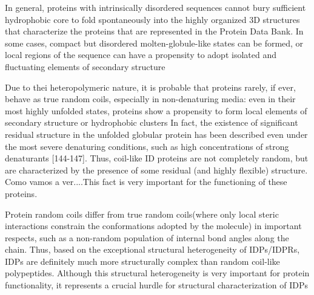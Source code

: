 In general, proteins with intrinsically disordered sequences cannot bury sufficient hydrophobic core to fold spontaneously into the highly organized 3D structures that characterize the proteins that are represented in the Protein Data Bank.
In some cases, compact but disordered molten-globule-like states can be formed, or local regions of the sequence can have a propensity to adopt isolated and fluctuating elements of secondary structure 

Due to thei heteropolymeric nature, it is probable that proteins rarely, if ever, behave as true random coils, especially in non-denaturing media: 
even in their most highly unfolded states, proteins show a propensity to form local elements of secondary structure or hydrophobic clusters
In fact, the existence of significant residual structure in the unfolded globular protein has been described even under the most severe denaturing conditions, such as high concentrations of strong denaturants [144-147]. 
Thus, coil-like ID proteins are not completely random, but are characterized by the presence of some residual (and highly flexible) structure. 
Como vamos a ver....This fact is very important for the functioning of these proteins.

Protein random coils differ from true random coils(where only local steric interactions constrain the conformations adopted by the molecule)
in important respects, such as a non-random population of internal bond angles along the chain.
Thus, based on the exceptional structural heterogeneity of IDPs/IDPRs, IDPs are definitely much more structurally complex than random coil-like polypeptides.
Although this structural heterogeneity is very important for protein functionality, it represents a crucial hurdle for structural characterization of IDPs

